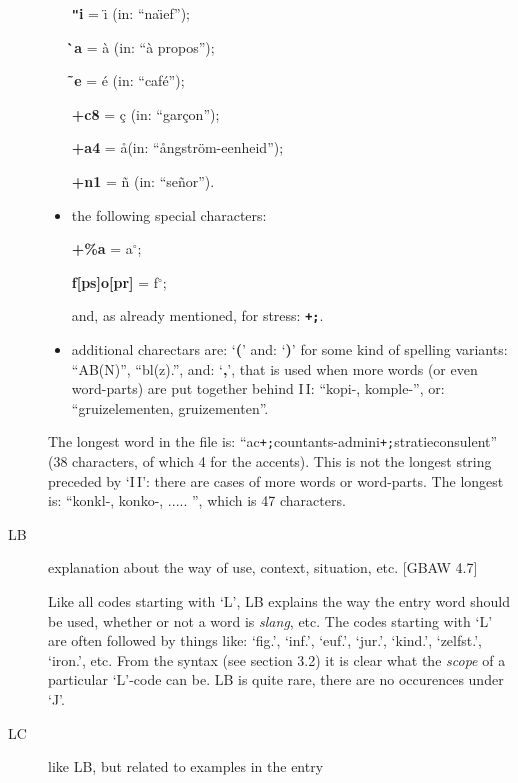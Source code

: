 \begin{description}
\begin{itemize}
              {\bf {\tt "}i} = \"{\i} (in: ``na\"{\i}ef'');

              {\bf \`\,a} = \`{a} (in: ``\`{a} propos'');

              {\bf \~\,e} = \'{e} (in: ``caf\'{e}'');

              {\bf +c8} = \c{c} (in: ``gar\c{c}on''); 

              {\bf +a4} = \aa (in: ``\aa ngstr\"{o}m-eenheid''); 

              {\bf +n1} = \~{n} (in: ``se\~{n}or'').
              
         \item the following special characters:

              {\bf +\%a} = a$^\circ$; 

              {\bf f[ps]o[pr]} = f$^\circ$;

              and, as already mentioned, for stress: {\bf {\tt +;}}.

         \item additional charectars are: `{\bf (}' and: `{\bf )}' for some
              kind of spelling variants: ``AB(N)'', ``bl(z).'', and: `{\bf ,}',
              that is used when more words (or even word-parts) are put
              together behind I\,I: ``kopi-, komple-'', or: ``gruizelementen, 
              gruizementen''.

     \end{itemize}
          The longest word in the file is: 
          ``ac{\tt +;}countants-admini{\tt +;}stratieconsulent''
          (38 characters, of which 4 
          for the accents). This is not the longest string preceded by `I\,I':
          there are cases of more words or word-parts. The longest is:
          ``konkl-, konko-, ..... '', which is 47 characters.

   \item [LB] explanation about the way of use, context, situation, etc.
              [GBAW 4.7]
 
         Like all codes starting with `L', LB explains the way the entry word
         should be used, whether or not a word is {\em slang}, etc. The codes
         starting with `L' are often followed by things like: `fig.', `inf.', 
         `euf.', `jur.', `kind.', `zelfst.', `iron.', etc. From the syntax 
         (see section 3.2) it is clear what the {\em scope} of a particular
         `L'-code
         can be. LB is quite rare, there are no occurences under `J'.

   \item [LC] like LB, but related to examples in the entry


\end{description}
